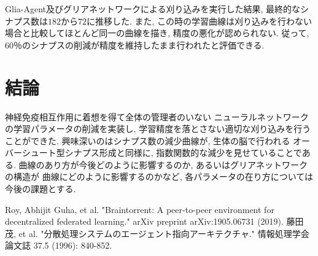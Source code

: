 \documentclass[a4paper, 9pt,twocolumn,dvipdfmx]{jsarticle}
\begin{document}
Glia-Agent及びグリアネットワークによる刈り込みを実行した結果, 最終的なシナプス数は$182$から$72$に推移した. 
また, この時の学習曲線は刈り込みを行わない場合と比較してほとんど同一の曲線を描き, 
精度の悪化が認められない.
従って, 60％のシナプスの削減が精度を維持したまま行われたと評価できる.
\section{結論}
神経免疫相互作用に着想を得て全体の管理者のいない
ニューラルネットワークの学習パラメータの削減を実装し, 
学習精度を落とさない適切な刈り込みを行うことができた.
興味深いのはシナプス数の減少曲線が, 生体の脳で行われる
オーバーシュート型シナプス形成と同様に, 
指数関数的な減少を見せていることである. 
曲線のあり方が今後どのように影響するのか, 
あるいはグリアネットワークの構造が
曲線にどのように影響するのかなど, 
各パラメータの在り方については今後の課題とする.
 \begin{thebibliography}{99}
  Roy, Abhijit Guha, et al. "Braintorrent: A peer-to-peer environment for decentralized federated learning." arXiv preprint arXiv:1905.06731 (2019).
  藤田茂, et al. "分散処理システムのエージェント指向アーキテクチャ." 情報処理学会論文誌 37.5 (1996): 840-852.
\end{thebibliography}
 
\end{document}
